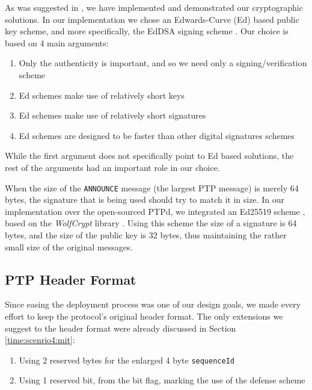 \documentclass[11pt]{article}
\begin{document}
As was suggested in \cite{Threat_Analysis}, we have implemented and demonstrated our cryptographic solutions. In our implementation we chose an Edwards-Curve (Ed) based public key scheme, and more specifically, the EdDSA signing scheme \cite{Ed}. Our choice is based on 4 main arguments:

\begin{enumerate}

  \item Only the authenticity is important, and so we need only a signing/verification scheme

  \item Ed schemes make use of relatively short keys

  \item Ed schemes make use of relatively short signatures

  \item Ed schemes are designed to be faster than other digital signatures schemes

\end{enumerate}

While the first argument does not specifically point to Ed based solutions, the rest of the arguments had an important role in our choice.



When the size of the \texttt{ANNOUNCE} message (the largest PTP message) is merely 64 bytes, the signature that is being used should try to match it in size. In our implementation over the open-sourced PTPd, we integrated an Ed25519 scheme \cite{Ed25519}, based on the \emph{WolfCrypt} library \cite{WolfCrypt}. Using this scheme the size of a signature is 64 bytes, and the size of the public key is 32 bytes, thus maintaining the rather small size of the original messages.



\subsection{PTP Header Format}\label{sol:header}

Since easing the deployment process was one of our design goals, we made every effort to keep the protocol's original header format. The only extensions we suggest to the header format were already discussed in Section \ref{time:scenrio4:mit}:

\begin{enumerate}

  \item Using 2 reserved bytes for the enlarged 4 byte \texttt{sequenceId}

  \item Using 1 reserved bit, from the bit flag, marking the use of the defense scheme

\end{enumerate}
\end{document}
